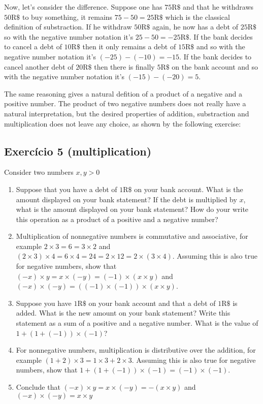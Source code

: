 Now, let's consider the difference. Suppose one has $75\text{R\$}$ and that he
withdraws $50\text{R\$}$ to buy something, it remains $75-50=25\text{R\$}$
which is the classical definition of substraction. If he withdraw
$50\text{R\$}$ again, he now has a debt of $25\text{R\$}$ so with the
negative number notation it's $25 - 50 = -25\text{R\$}$. If the bank decides
to cancel a debt of $10\text{R\$}$ then it only remains a debt of
$15\text{R\$}$ and so with the negative number notation it's
${(-25)} - {(-10)} = -15$. If the bank decides to cancel another debt of
$20\text{R\$}$ then there is finally $5\text{R\$}$ on the bank account and
so with the negative number notation it's ${(-15)} - {(-20)} = 5$.

The same reasoning gives a natural defition of a product of a negative and a
positive number. The product of two negative numbers does not really have a
natural interpretation, but the desired properties of addition, substraction
and multiplication does not leave any choice, as shown by the following
exercise:

\subsection*{Exercício 5 (multiplication)}

Consider two numbers $x,y > 0$

\begin{enumerate}

\item Suppose that you have a debt of $1\text{R\$}$ on your bank account.
  What is the amount displayed on your bank statement?
  If the debt is multiplied by $x$, what is the amount displayed
  on your bank statement? How do your write this operation as a
  product of a positive and a negative number?
\item Multiplication of nonnegative numbers is commutative and associative,
  for example $2 \times 3 = 6 = 3 \times 2$ and
  ${(2 \times 3)} \times 4 = {6 \times 4} = 24 = {2 \times 12} =
  2 \times {(3 \times 4)}$. Assuming this is also true for negative
  numbers, show that
  ${(-x)} \times y = x \times {(-y)} = {(-1)} \times {(x \times y)}$
  and
  ${(-x)} \times {(-y)} =
  \left({(-1)} \times {(-1)}\right) \times \left(x \times y\right)$.
\item Suppose you
  have $1\text{R\$}$ on your bank account and that a debt of $1\text{R\$}$
  is added. What is the new amount on your bank statement?
  Write this statement as a sum of a positive and a negative number.
  What is the value of $1 + {(1 + (-1))} \times {(-1)}$?
\item For nonnegative numbers, multiplication is distributive over
  the addition, for example ${(1+2)} \times 3 =
  {1 \times 3} + {2 \times 3}$. Assuming this is
  also true for negative numbers, show that
  $1 + {(1 + (-1))} \times {(-1)} = {{(-1)} \times {(-1)}}$.
\item
  Conclude that
  ${(-x)} \times y = x \times {(-y)} = -{(x \times y)}$ and
  ${(-x)} \times {(-y)} = x \times y$
\end{enumerate}


